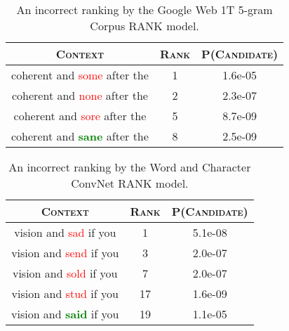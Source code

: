 \begin{table}
\centering
\begin{tabular}{ccc}
\hline
\textsc{Context} & \textsc{Rank} & \textsc{P(Candidate)} \\
\hline
coherent and \textcolor{red}{some} after the & 1 & 1.6e-05 \\
coherent and \textcolor{red}{none} after the & 2 & 2.3e-07 \\
coherent and \textcolor{red}{sore} after the & 5 & 8.7e-09 \\
coherent and \textcolor{green}{\textbf{sane}} after the & 8 & 2.5e-09 \\
\hline
\end{tabular}
\caption{An incorrect ranking by the Google Web 1T 5-gram Corpus \textsc{RANK} model.}
\end{table}

\begin{table}
\centering
\begin{tabular}{ccc}
\hline
\textsc{Context} & \textsc{Rank} & \textsc{P(Candidate)} \\
\hline
vision and \textcolor{red}{sad} if you &     1 &     5.1e-08 \\
vision and \textcolor{red}{send} if you &     3 &    2.0e-07 \\
vision and \textcolor{red}{sold} if you &     7 &    2.0e-07 \\
vision and \textcolor{red}{stud} if you &    17 &    1.6e-09 \\
vision and \textcolor{green}{\textbf{said}} if you &    19 &                      1.1e-05 \\
\hline
\end{tabular}
\caption{An incorrect ranking by the Word and Character ConvNet \textsc{RANK} model.}
\end{table}